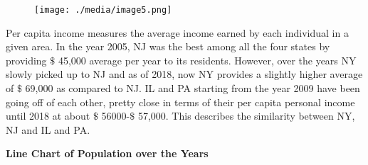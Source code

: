\documentclass[12pt]{article}
\begin{document}

\begin{figure}[H]
\advance\leftskip 0.02in		\texttt{[image: ./media/image5.png]}
\end{figure}



\par

\begin{justify}
Per capita income measures the average income earned by each individual in a given area. In the year 2005, NJ was the best among all the four states by providing $\$$ 45,000 average per year to its residents. However, over the years NY slowly picked up to NJ and as of 2018, now NY provides a slightly higher average of $\$$ 69,000 as compared to NJ. IL and PA starting from the year 2009 have been going off of each other, pretty close in terms of their per capita personal income until 2018 at about $\$$ 56000-$\$$ 57,000. This describes the similarity between NY, NJ and IL and PA.
\end{justify}\par


\vspace{\baselineskip}

\vspace{\baselineskip}

\vspace{\baselineskip}

\vspace{\baselineskip}

\vspace{\baselineskip}
\begin{adjustwidth}{1.5in}{0.0in}
\begin{justify}
\textbf{Line Chart of Population over the Years}
\end{justify}\par

\end{adjustwidth}





\begin{figure}[H]	\begin{subfigure}		\texttt{[image: ./media/image6.png]}
	\end{subfigure}
~	\begin{subfigure}		\texttt{[image: ./media/image7.png]}
	\end{subfigure}
~
\end{figure}
\end{document}
